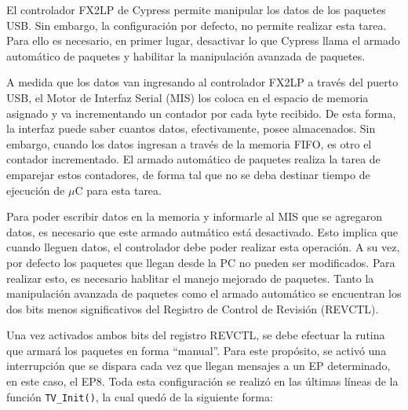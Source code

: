 	El controlador FX2LP de Cypress permite manipular los datos de los paquetes USB. Sin embargo, la configuración por defecto, no permite realizar esta tarea. Para ello es necesario, en primer lugar, desactivar lo que Cypress llama el armado automático de paquetes y habilitar la manipulación avanzada de paquetes\cite{CypressSemiconductor2014fx2lp}.
	
	A medida que los datos van ingresando al controlador FX2LP a través del puerto USB, el Motor de Interfaz Serial (MIS) los coloca en el espacio de memoria asignado y va incrementando un contador por cada byte recibido. De esta forma, la interfaz puede saber cuantos datos, efectivamente, posee almacenados. Sin embargo, cuando los datos ingresan a través de la memoria FIFO, es otro el contador incrementado. El armado automático de paquetes realiza la tarea de emparejar estos contadores, de forma tal que no se deba destinar tiempo de ejecución de $\mu$C para esta tarea.
	
	Para poder escribir datos en la memoria y informarle al MIS que se agregaron datos, es necesario que este armado autmático está desactivado. Esto implica que cuando lleguen datos, el controlador debe poder realizar esta operación. A su vez, por defecto los paquetes que llegan desde la PC no pueden ser modificados. Para realizar esto, es necesario hablitar el manejo mejorado de paquetes. Tanto la manipulación avanzada de paquetes como el armado automático se encuentran los dos bits menos significativos del Registro de Control de Revisión (REVCTL).
	
	Una vez activados ambos bits del registro REVCTL, se debe efectuar la rutina que armará los paquetes en forma ``manual''. Para este propósito, se activó una interrupción que se dispara cada vez que llegan mensajes a un EP determinado, en este caso, el EP8. Toda esta configuración se realizó en las últimas líneas de la función \verb|TV_Init()|, la cual quedó de la siguiente forma:
	
	\begin{lstlisting}[language=C,backgroundcolor={gray!30}]
	
	\end{lstlisting}
